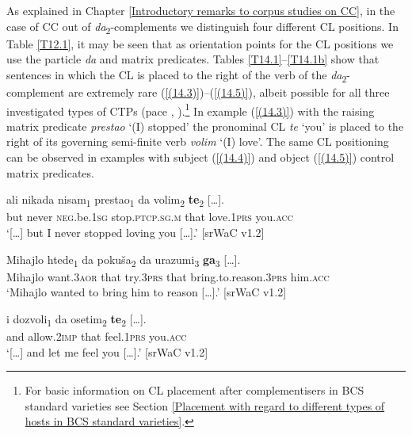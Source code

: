 As explained in Chapter \ref{Introductory remarks to corpus studies on CC}, in the case of CC out of \textit{da}\textsubscript{2}-complements we distinguish four different CL positions. In Table \ref{T12.1}, it may be seen that as orientation points for the CL positions we use the particle \textit{da} and matrix predicates. Tables \ref{T14.1}--\ref{T14.1b} show that sentences in which the CL is placed to the right of the verb of the \textit{da}\textsubscript{2}-complement are extremely rare (\ref{(14.3)})--(\ref{(14.5)}), albeit possible for all three investigated types of CTPs (pace \citealt[41]{Browne03}, \citealt[41]{CavarWilder94}).\footnote{For basic information on CL placement after complementisers in BCS standard varieties see Section \ref{Placement with regard to different types of hosts in BCS standard varieties}.} In example (\ref{(14.3)}) with the raising matrix predicate \textit{prestao} ‘(I) stopped’ the pronominal CL \textit{te} ‘you’ is placed to the right of its governing semi-finite verb \textit{volim} ‘(I) love’. The same CL positioning can be observed in examples with subject (\ref{(14.4)}) and object (\ref{(14.5)}) control matrix predicates. 

\begin{exe}
\ex\label{(14.3)}
\gll [\dots] ali nikada nisam\textsubscript{1} prestao\textsubscript{1} da volim\textsubscript{2} {\textbf{te}\textsubscript{2} [\dots].} \\
{} but never \textsc{neg}.be.\textsc{1sg} stop.\textsc{ptcp.sg.m} that love.\textsc{1prs} you.\textsc{acc} \\
\glt ‘[\dots] but I never stopped loving you [\dots].’
\hfill [srWaC v1.2]

\ex\label{(14.4)}
\gll Mihajlo htede\textsubscript{1} da pokuša\textsubscript{2} da urazumi\textsubscript{3} {\textbf{ga}\textsubscript{3} [\dots].} \\
Mihajlo want.\textsc{3aor} that try.\textsc{3prs} that bring.to.reason.\textsc{3prs} him.\textsc{acc} \\
\glt  ‘Mihajlo wanted to bring him to reason [\dots].’
\hfill [srWaC v1.2]

\ex\label{(14.5)}
\gll [\dots] i dozvoli\textsubscript{1} da osetim\textsubscript{2} {\textbf{te}\textsubscript{2} [\dots].}  \\
{} and allow.\textsc{2imp} that feel.\textsc{1prs} you.\textsc{acc} \\
\glt ‘[\dots] and let me feel you [\dots].’
\hfill [srWaC v1.2]
\end{exe}

